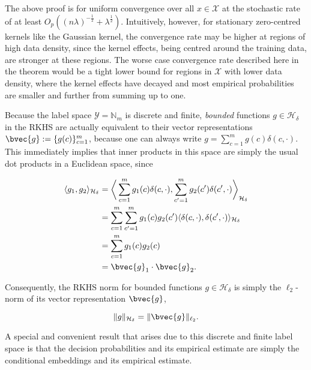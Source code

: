 \documentclass{article}
\numberwithin{equation}{section}
\numberwithin{table}{section}
\numberwithin{algorithm}{section}
\begin{document}
	The above proof is for uniform convergence over all $x \in \mathcal{X}$ at the stochastic rate of at least $O_{p}((n \lambda)^{-\frac{1}{2}} + \lambda^{\frac{1}{2}})$. Intuitively, however, for stationary zero-centred kernels like the Gaussian kernel, the convergence rate may be higher at regions of high data density, since the kernel effects, being centred around the training data, are stronger at these regions. The worse case convergence rate described here in the theorem would be a tight lower bound for regions in $\mathcal{X}$ with lower data density, where the kernel effects have decayed and most empirical probabilities are smaller and further from summing up to one.
	
	Because the label space $\mathcal{Y} = \mathbb{N}_{m}$ is discrete and finite, \textit{bounded} functions $g \in \mathcal{H}_{\delta}$ in the RKHS are actually equivalent to their vector representations $\bvec{g} := \{g(c)\}_{c = 1}^{m}$, because one can always write $g = \sum_{c = 1}^{m} g(c) \delta(c, \cdot)$. This immediately implies that inner products in this space are simply the usual dot products in a Euclidean space, since
	
	\begin{equation}
		\begin{aligned}
			\langle g_{1}, g_{2} \rangle_{\mathcal{H}_{\delta}} &= \bigg\langle \sum_{c = 1}^{m} g_{1}(c) \delta(c, \cdot), \sum_{c' = 1}^{m} g_{2}(c') \delta(c', \cdot)  \bigg\rangle_{\mathcal{H}_{\delta}} \\
			&= \sum_{c = 1}^{m} \sum_{c' = 1}^{m} g_{1}(c) g_{2}(c') \langle \delta(c, \cdot), \delta(c', \cdot) \rangle_{\mathcal{H}_{\delta}} \\
			&= \sum_{c = 1}^{m} g_{1}(c) g_{2}(c) \\
			&= \bvec{g}_{1} \cdot \bvec{g}_{2}.
		\end{aligned}
	\end{equation}
	
	Consequently, the RKHS norm for bounded functions $g \in \mathcal{H}_{\delta}$ is simply the $\ell_{2}$-norm of its vector representation $\bvec{g}$,
	
	\begin{equation}
	\lVert g \rVert_{\mathcal{H}_{\delta}} = \lVert \bvec{g} \rVert_{\ell_{2}}.
	\label{eq:rkhs_norm_is_l2_norm}
	\end{equation}
	
	A special and convenient result that arises due to this discrete and finite label space is that the decision probabilities and its empirical estimate are simply the conditional embeddings and its empirical estimate.
	
\end{document}
